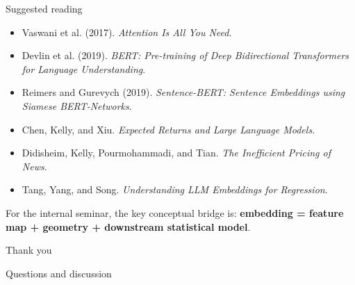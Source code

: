 \documentclass[aspectratio=169]{beamer}
\begin{document}
\begin{frame}{Suggested reading}
\footnotesize
\begin{itemize}
  \item Vaswani et al. (2017). \textit{Attention Is All You Need}.
  \item Devlin et al. (2019). \textit{BERT: Pre-training of Deep Bidirectional Transformers for Language Understanding}.
  \item Reimers and Gurevych (2019). \textit{Sentence-BERT: Sentence Embeddings using Siamese BERT-Networks}.
  \item Chen, Kelly, and Xiu. \textit{Expected Returns and Large Language Models}.
  \item Didisheim, Kelly, Pourmohammadi, and Tian. \textit{The Inefficient Pricing of News}.
  \item Tang, Yang, and Song. \textit{Understanding LLM Embeddings for Regression}.
\end{itemize}

\vspace{0.3cm}

\begin{bluebox}
For the internal seminar, the key conceptual bridge is: \textbf{embedding = feature map + geometry + downstream statistical model}.
\end{bluebox}
\end{frame}

\begin{frame}
\centering
\Huge Thank you

\vspace{0.5cm}
\Large Questions and discussion
\end{frame}
\end{document}
